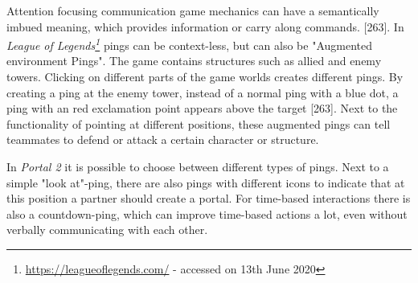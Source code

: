Attention focusing communication game mechanics can have a semantically imbued meaning, which provides information or carry along commands. \autocite{Toups2014ATheory}[263].
In \textit{League of Legends\footnote{\url{https://leagueoflegends.com/} - accessed on 13th June 2020}} pings can be context-less, but can also be "Augmented environment Pings". The game contains structures such as allied and enemy towers. Clicking on different parts of the game worlds creates different pings. By creating a ping at the enemy tower, instead of a normal ping with a blue dot, a ping with an red exclamation point appears above the target \autocite{Toups2014ATheory}[263]. Next to the functionality of pointing at different positions, these augmented pings can tell teammates to defend or attack a certain character or structure.

In \textit{Portal 2} it is possible to choose between different types of pings. Next to a simple "look at"-ping, there are also pings with different icons to indicate that at this position a partner should create a portal. For time-based interactions there is also a countdown-ping, which can improve time-based actions a lot, even without verbally communicating with each other.